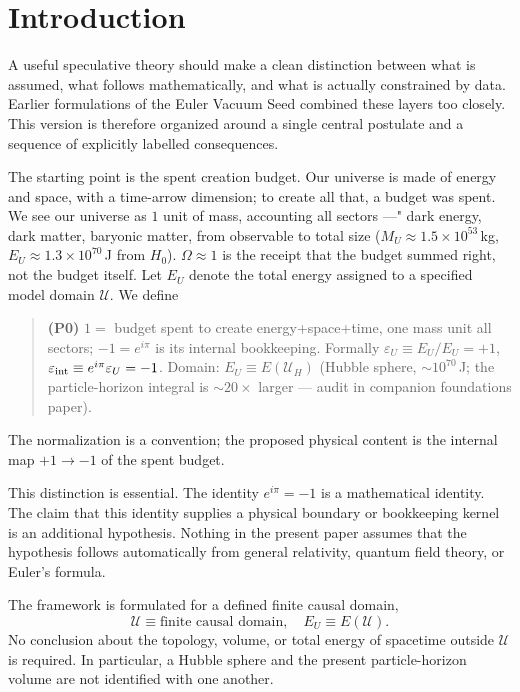 \documentclass[twocolumn]{aastex631}
\begin{document}

\section{Introduction}
A useful speculative theory should make a clean distinction between what is assumed, what follows mathematically, and what is actually constrained by data. Earlier formulations of the Euler Vacuum Seed combined these layers too closely. This version is therefore organized around a single central postulate and a sequence of explicitly labelled consequences.

The starting point is the spent creation budget. Our universe is made of energy and space, with a time-arrow dimension; to create all that, a budget was spent. We see our universe as $1$ unit of mass, accounting all sectors ---" dark energy, dark matter, baryonic matter, from observable to total size ($M_{U}\approx1.5\times10^{53}$\,kg, $E_{U}\approx1.3\times10^{70}$\,J from $H_{0}$). $\Omega\approx1$ is the receipt that the budget summed right, not the budget itself. Let $E_U$ denote the total energy assigned to a specified model domain $\mathcal U$. We define
\begin{quote}
\textbf{(P0)} $1=$ budget spent to create energy+space+time, one mass unit all sectors; $-1=e^{i\pi}$ is its internal bookkeeping. Formally $\varepsilon_U\equiv E_U/E_U=+1$, $\varepsilon_{\rm int}\equiv e^{i\pi}\varepsilon_U=-1$. Domain: $E_U\equiv E(\mathcal U_H)$ (Hubble sphere, $\sim10^{70}$\,J; the particle-horizon integral is $\sim20\times$ larger --- audit in companion foundations paper).
\end{quote}
The normalization is a convention; the proposed physical content is the internal map $+1\to-1$ of the spent budget.

This distinction is essential. The identity $e^{i\pi}=-1$ is a mathematical identity. The claim that this identity supplies a physical boundary or bookkeeping kernel is an additional hypothesis. Nothing in the present paper assumes that the hypothesis follows automatically from general relativity, quantum field theory, or Euler's formula.

The framework is formulated for a defined finite causal domain,
\[
\boxed{\mathcal U\equiv\text{finite causal domain}},\quad
E_U\equiv E(\mathcal U).
\]
No conclusion about the topology, volume, or total energy of spacetime outside $\mathcal U$ is required. In particular, a Hubble sphere and the present particle-horizon volume are not identified with one another.
\end{document}
